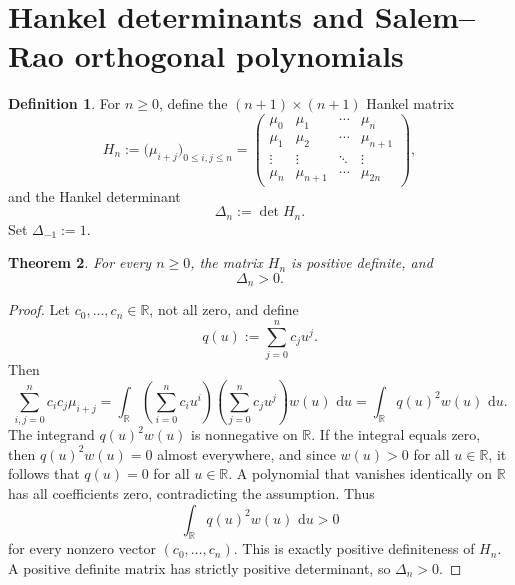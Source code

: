 \documentclass[11pt]{amsart}
\numberwithin{equation}{section}
\newtheorem{theorem}{Theorem}[section]
\theoremstyle{definition}
\newtheorem{definition}[theorem]{Definition}
\newcommand{\R}{\mathbb{R}}
\newcommand{\dd}{\,\mathrm{d}}
\newcommand{\mom}[1]{\mu_{#1}}
\newcommand{\Hankel}[1]{H_{#1}}
\newcommand{\DeltaH}[1]{\Delta_{#1}}
\begin{document}
\section{Hankel determinants and Salem--Rao orthogonal polynomials}

\begin{definition}\label{def:hankel}
For $n\ge 0$, define the $(n+1)\times(n+1)$ Hankel matrix
\begin{equation}\label{eq:hankel-matrix}
\Hankel{n}
:=\bigl(\mom{i+j}\bigr)_{0\le i,j\le n}
=\begin{pmatrix}
\mom{0} & \mom{1} & \cdots & \mom{n}\\
\mom{1} & \mom{2} & \cdots & \mom{n+1}\\
\vdots  & \vdots  & \ddots & \vdots\\
\mom{n} & \mom{n+1} & \cdots & \mom{2n}
\end{pmatrix},
\end{equation}
and the Hankel determinant
\begin{equation}\label{eq:hankel-det}
\DeltaH{n}:=\det\Hankel{n}.
\end{equation}
Set $\DeltaH{-1}:=1$.
\end{definition}

\begin{theorem}\label{thm:hankel-positive}
For every $n\ge 0$, the matrix $\Hankel{n}$ is positive definite, and
\begin{equation}\label{eq:hankel-positive}
\DeltaH{n}>0.
\end{equation}
\end{theorem}

\begin{proof}
Let $c_{0},\dots,c_{n}\in\R$, not all zero, and define
\[
q(u):=\sum_{j=0}^{n}c_{j}u^{j}.
\]
Then
\[
\sum_{i,j=0}^{n}c_{i}c_{j}\mom{i+j}
=\int_{\R}\left(\sum_{i=0}^{n}c_{i}u^{i}\right)
\left(\sum_{j=0}^{n}c_{j}u^{j}\right)w(u)\,\dd u
=\int_{\R}q(u)^{2}w(u)\,\dd u.
\]
The integrand $q(u)^{2}w(u)$ is nonnegative on $\R$. If the integral equals
zero, then $q(u)^{2}w(u)=0$ almost everywhere, and since $w(u)>0$ for all
$u\in\R$, it follows that $q(u)=0$ for all $u\in\R$. A polynomial that vanishes
identically on $\R$ has all coefficients zero, contradicting the assumption.
Thus
\[
\int_{\R}q(u)^{2}w(u)\,\dd u>0
\]
for every nonzero vector $(c_{0},\dots,c_{n})$. This is exactly positive
definiteness of $\Hankel{n}$. A positive definite matrix has strictly positive
determinant, so $\DeltaH{n}>0$.
\end{proof}
\end{document}
